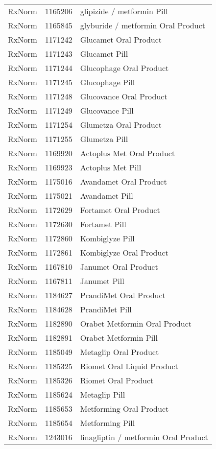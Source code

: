 \begin{longtable}{p{}p{}p{}}
  RxNorm & 1165206 & glipizide / metformin Pill \\ 
  RxNorm & 1165845 & glyburide / metformin Oral Product \\ 
  RxNorm & 1171242 & Glucamet Oral Product \\ 
  RxNorm & 1171243 & Glucamet Pill \\ 
  RxNorm & 1171244 & Glucophage Oral Product \\ 
  RxNorm & 1171245 & Glucophage Pill \\ 
  RxNorm & 1171248 & Glucovance Oral Product \\ 
  RxNorm & 1171249 & Glucovance Pill \\ 
  RxNorm & 1171254 & Glumetza Oral Product \\ 
  RxNorm & 1171255 & Glumetza Pill \\ 
  RxNorm & 1169920 & Actoplus Met Oral Product \\ 
  RxNorm & 1169923 & Actoplus Met Pill \\ 
  RxNorm & 1175016 & Avandamet Oral Product \\ 
  RxNorm & 1175021 & Avandamet Pill \\ 
  RxNorm & 1172629 & Fortamet Oral Product \\ 
  RxNorm & 1172630 & Fortamet Pill \\ 
  RxNorm & 1172860 & Kombiglyze Pill \\ 
  RxNorm & 1172861 & Kombiglyze Oral Product \\ 
  RxNorm & 1167810 & Janumet Oral Product \\ 
  RxNorm & 1167811 & Janumet Pill \\ 
  RxNorm & 1184627 & PrandiMet Oral Product \\ 
  RxNorm & 1184628 & PrandiMet Pill \\ 
  RxNorm & 1182890 & Orabet Metformin Oral Product \\ 
  RxNorm & 1182891 & Orabet Metformin Pill \\ 
  RxNorm & 1185049 & Metaglip Oral Product \\ 
  RxNorm & 1185325 & Riomet Oral Liquid Product \\ 
  RxNorm & 1185326 & Riomet Oral Product \\ 
  RxNorm & 1185624 & Metaglip Pill \\ 
  RxNorm & 1185653 & Metforming Oral Product \\ 
  RxNorm & 1185654 & Metforming Pill \\ 
  RxNorm & 1243016 & linagliptin / metformin Oral Product \\ 

\end{longtable}
